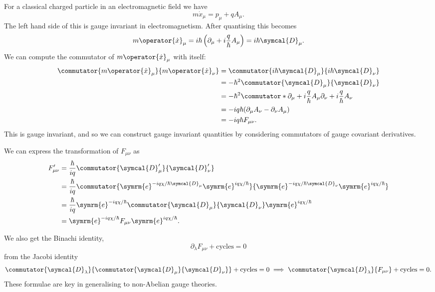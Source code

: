 \documentclass[fleqn]{NotesClass}
\newcommand{\e}{\symrm{e}}
\newcommand{\covariantDerivative}{\symcal{D}}
\begin{document}
    For a classical charged particle in an electromagnetic field we have
    \begin{equation}
        m\dot{x}_\mu = p_\mu + q A_\mu.
    \end{equation}
    The left hand side of this is gauge invariant in electromagnetism.
    After quantising this becomes
    \begin{equation}
        m\operator{\dot{x}}_\mu = i\hbar\left( \partial_\mu + i\frac{q}{\hbar}A_\mu \right) = i\hbar \covariantDerivative_\mu.
    \end{equation}
    We can compute the commutator of \(m\operator{\dot{x}}_\mu\) with itself:
    \begin{align}
        \commutator{m\operator{\dot{x}}_\mu}{m\operator{\dot{x}}_\nu} &= \commutator{i\hbar \covariantDerivative_\mu}{i\hbar \covariantDerivative_\nu}\\
        &= -\hbar^2 \commutator{\covariantDerivative_\mu}{\covariantDerivative_\nu}\\
        &= -\hbar^2\commutator*{\partial_\mu + i\frac{q}{\hbar}A_\mu}{\partial_\nu + i\frac{q}{\hbar} A_\nu}\\
        &= -iq\hbar(\partial_\mu A_\nu - \partial_\nu A_\mu)\\
        &= -iq\hbar F_{\mu\nu}.
    \end{align}
    This is gauge invariant, and so we can construct gauge invariant quantities by considering commutators of gauge covariant derivatives.
    
    We can express the transformation of \(F_{\mu\nu}\) as
    \begin{align}
        F'_{\mu\nu} &= \frac{\hbar}{iq} \commutator{\covariantDerivative'_\mu}{\covariantDerivative'_\nu}\\
        &= \frac{\hbar}{iq} \commutator{\e^{-iq\chi/\hbar \covariantDerivative_\mu} \e^{iq\chi/\hbar}}{\e^{-iq\chi/\hbar \covariantDerivative_\nu} \e^{iq\chi/\hbar}}\\
        &= \frac{\hbar}{iq} \e^{-iq\chi/\hbar} \commutator{\covariantDerivative_\mu}{\covariantDerivative_\nu} \e^{iq\chi/\hbar}\\
        &= \e^{-iq\chi/\hbar} F_{\mu\nu} \e^{iq\chi/\hbar}.
    \end{align}
    
    We also get the Binachi identity,
    \begin{equation}
        \partial_\lambda F_{\mu\nu} + \text{cycles} = 0
    \end{equation}
    from the Jacobi identity
    \begin{equation}
        \commutator{\covariantDerivative_\lambda}{\commutator{\covariantDerivative_\mu}{\covariantDerivative_\nu}} + \text{cycles} = 0 \implies \commutator{\covariantDerivative_\lambda}{F_{\mu\nu}} + \text{cycles} = 0.
    \end{equation}
    These formulae are key in generalising to non-Abelian gauge theories.
    
\end{document}
